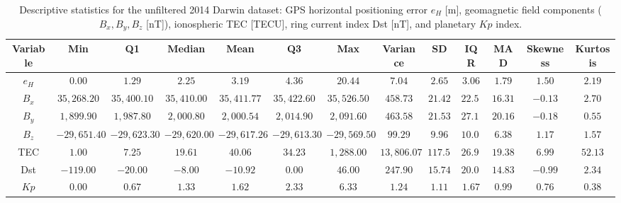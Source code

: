 \vspace{-3pt}
\begin{table}[H]
\caption{Descriptive statistics for the unfiltered 2014 Darwin dataset: GPS horizontal positioning error $e_H$ [m], geomagnetic field components ($B_x, B_y, B_z$ [nT]), ionospheric TEC [TECU], ring current index Dst [nT], and planetary $Kp$ index.\label{tab:Descriptive_Statistics_All_Variables}}
\begin{tabularx}{\textwidth}{CCCCCCCCCCCCC}
\toprule
\textbf{Variable} & \textbf{Min} & \textbf{Q1} & \textbf{Median} & \textbf{Mean} & \textbf{Q3} & \textbf{Max} & \textbf{Variance} & \textbf{SD} & \textbf{IQR} & \textbf{MAD} & \textbf{Skewness} & \textbf{Kurtosis} \\
\midrule
$e_H$ & $0.00$ & $1.29$ & $2.25$ & $3.19$ & $4.36$ & $20.44$ & $7.04$ & $2.65$ & $3.06$ & $1.79$ & $1.50$ & $2.19$ \\
$B_x$ & $35,268.20$ & $35,400.10$ & $35,410.00$ & $35,411.77$ & $35,422.60$ & $35,526.50$ & $458.73$ & $21.42$ & $22.50$ & $16.31$ & $-0.13$ & $2.70$ \\
$B_y$ & $1,899.90$ & $1,987.80$ & $2,000.80$ & $2,000.54$ & $2,014.90$ & $2,091.60$ & $463.58$ & $21.53$ & $27.10$ & $20.16$ & $-0.18$ & $0.55$ \\
$B_z$ & $-29,651.40$ & $-29,623.30$ & $-29,620.00$ & $-29,617.26$ & $-29,613.30$ & $-29,569.50$ & $99.29$ & $9.96$ & $10.00$ & $6.38$ & $1.17$ & $1.57$ \\
TEC & $1.00$ & $7.25$ & $19.61$ & $40.06$ & $34.23$ & $1,288.00$ & $13,806.07$ & $117.50$ & $26.98$ & $19.38$ & $6.99$ & $52.13$ \\
Dst & $-119.00$ & $-20.00$ & $-8.00$ & $-10.92$ & $0.00$ & $46.00$ & $247.90$ & $15.74$ & $20.00$ & $14.83$ & $-0.99$ & $2.34$ \\
$Kp$ & $0.00$ & $0.67$ & $1.33$ & $1.62$ & $2.33$ & $6.33$ & $1.24$ & $1.11$ & $1.67$ & $0.99$ & $0.76$ & $0.38$ \\
\bottomrule
\end{tabularx}
\end{table}
\vspace{-3pt}
